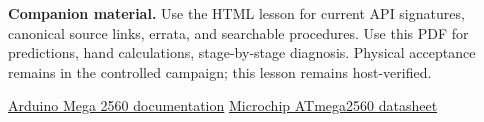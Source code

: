 \documentclass[11pt]{article}
\begin{document}
\vfill
\small
\textbf{Companion material.}
Use the HTML lesson for current API signatures, canonical source links, errata,
and searchable procedures. Use this PDF for predictions, hand calculations,
stage-by-stage diagnosis. Physical acceptance remains in the controlled
campaign; this lesson remains host-verified.

\href{https://docs.arduino.cc/hardware/mega-2560/}
{Arduino Mega 2560 documentation}\quad
\href{https://www.microchip.com/en-us/product/ATmega2560}
{Microchip ATmega2560 datasheet}
\end{document}
